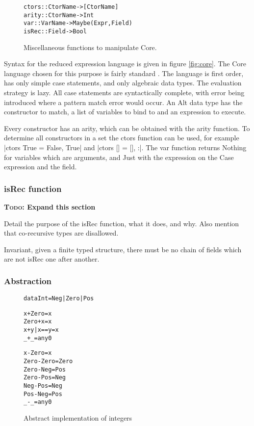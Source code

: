 \documentclass[preprint]{sigplanconf}
\newcommand{\C}[1]{\textsf{#1}}
\newcommand{\todo}[1]{\textbf{\textsc{Todo:} #1}}
\newenvironment{code}{\begin{alltt}\small}{\end{alltt}}
\begin{document}
\begin{figure}
\begin{code}
ctors     :: CtorName  -> [CtorName]
arity     :: CtorName  -> Int
var       :: VarName   -> Maybe (Expr, Field)
isRec     :: Field     -> Bool
\end{code}
\caption{Miscellaneous functions to manipulate Core.}
\end{figure}

Syntax for the reduced expression language is given in figure \ref{fig:core}. The Core language chosen for this purpose is fairly standard \cite{spj_lester_book}. The language is first order, has only simple case statements, and only algebraic data types. The evaluation strategy is lazy. All case statements are syntactically complete, with error being introduced where a pattern match error would occur. An \C{Alt} data type has the constructor to match, a list of variables to bind to and an expression to execute.

Every constructor has an arity, which can be obtained with the \C{arity} function. To determine all constructors in a set the \C{ctors} function can be used, for example |ctors True = {False, True}| and |ctors [] = {[], :}|. The \C{var} function returns \C{Nothing} for variables which are arguments, and \C{Just} with the expression on the \C{Case} expression and the field.

\subsubsection{\C{isRec} function}

\todo{Expand this section}

Detail the purpose of the \C{isRec} function, what it does, and why. Also mention that co-recursive types are disallowed.

Invariant, given a finite typed structure, there must be no chain of fields which are not \C{isRec} one after another.

\subsubsection{Abstraction}

\begin{figure}
\begin{code}
data Int = Neg | Zero | Pos

x     + Zero  = x
Zero  + x     = x
x     + y     | x == y = x
_     + _     = any0

x     - Zero  = x
Zero  - Zero  = Zero
Zero  - Neg   = Pos
Zero  - Pos   = Neg
Neg   - Pos   = Neg
Pos   - Neg   = Pos
_     - _     = any0
\end{code}
\caption{Abstract implementation of integers}
\label{fig:abstract_int}
\end{figure}
\end{document}
